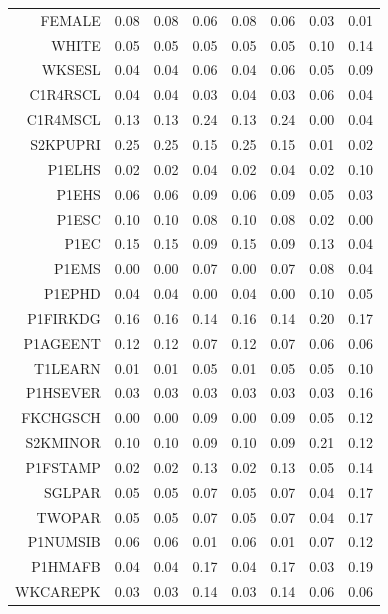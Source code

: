 \documentclass[oupdraft]{bio}
\begin{document}
\begin{center}
\begin{longtable}{r|c|c|c|c|c|c|c}
\hline \hline
\endlastfoot
  FEMALE & 0.08 & 0.08 & 0.06 & 0.08 & 0.06 & 0.03 & 0.01 \\ 
  WHITE & 0.05 & 0.05 & 0.05 & 0.05 & 0.05 & 0.10 & 0.14 \\ 
  WKSESL & 0.04 & 0.04 & 0.06 & 0.04 & 0.06 & 0.05 & 0.09 \\ 
  C1R4RSCL & 0.04 & 0.04 & 0.03 & 0.04 & 0.03 & 0.06 & 0.04 \\ 
  C1R4MSCL & 0.13 & 0.13 & \cellcolor[gray]{.9}0.24 & 0.13 & \cellcolor[gray]{.9}0.24 & 0.00 & 0.04 \\ 
  S2KPUPRI & \cellcolor[gray]{.9}0.25 & \cellcolor[gray]{.9}0.25 & 0.15 & \cellcolor[gray]{.9}0.25 & 0.15 & 0.01 & 0.02 \\ 
  P1ELHS & 0.02 & 0.02 & 0.04 & 0.02 & 0.04 & 0.02 & 0.10 \\ 
  P1EHS & 0.06 & 0.06 & 0.09 & 0.06 & 0.09 & 0.05 & 0.03 \\ 
  P1ESC & 0.10 & 0.10 & 0.08 & 0.10 & 0.08 & 0.02 & 0.00 \\ 
  P1EC & 0.15 & 0.15 & 0.09 & 0.15 & 0.09 & 0.13 & 0.04 \\ 
  P1EMS & 0.00 & 0.00 & 0.07 & 0.00 & 0.07 & 0.08 & 0.04 \\ 
  P1EPHD & 0.04 & 0.04 & 0.00 & 0.04 & 0.00 & 0.10 & 0.05 \\ 
  P1FIRKDG & 0.16 & 0.16 & 0.14 & 0.16 & 0.14 & \cellcolor[gray]{.9}0.20 & 0.17 \\ 
  P1AGEENT & 0.12 & 0.12 & 0.07 & 0.12 & 0.07 & 0.06 & 0.06 \\ 
  T1LEARN & 0.01 & 0.01 & 0.05 & 0.01 & 0.05 & 0.05 & 0.10 \\ 
  P1HSEVER & 0.03 & 0.03 & 0.03 & 0.03 & 0.03 & 0.03 & 0.16 \\ 
  FKCHGSCH & 0.00 & 0.00 & 0.09 & 0.00 & 0.09 & 0.05 & 0.12 \\ 
  S2KMINOR & 0.10 & 0.10 & 0.09 & 0.10 & 0.09 & \cellcolor[gray]{.9}0.21 & 0.12 \\ 
  P1FSTAMP & 0.02 & 0.02 & 0.13 & 0.02 & 0.13 & 0.05 & 0.14 \\ 
  SGLPAR & 0.05 & 0.05 & 0.07 & 0.05 & 0.07 & 0.04 & 0.17 \\ 
  TWOPAR & 0.05 & 0.05 & 0.07 & 0.05 & 0.07 & 0.04 & 0.17 \\ 
  P1NUMSIB & 0.06 & 0.06 & 0.01 & 0.06 & 0.01 & 0.07 & 0.12 \\ 
  P1HMAFB & 0.04 & 0.04 & 0.17 & 0.04 & 0.17 & 0.03 & 0.19 \\ 
  WKCAREPK & 0.03 & 0.03 & 0.14 & 0.03 & 0.14 & 0.06 & 0.06 \\ 

\end{longtable}
\end{center}
\end{document}
